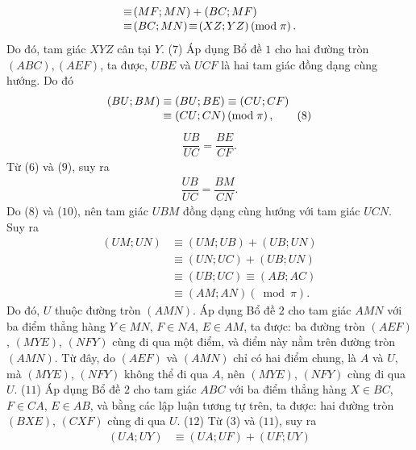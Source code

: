 \begin{multicols}{2}
\begin{align*}
			&\!\equiv\! \left( {MF;MN} \right) + \left( {BC;MF} \right) \\[-0.5ex]
			&\!\equiv\! \left( {BC;MN} \right) \!\equiv\! \left( {XZ;YZ} \right)\left( {{\rm{mod}}\;\pi } \right).
	\end{align*}
	Do đó, tam giác $XYZ$ cân tại $Y$. \hfill ($7$)
	\vskip 0.05cm
	Áp dụng Bổ đề $1$ cho hai đường tròn  $(ABC), (AEF)$, ta được, $UBE$ và $UCF$ là hai tam giác đồng dạng cùng hướng. Do đó
	\begin{align*}
		\left( {BU;BM} \right) &\equiv \left( {BU;BE} \right) \equiv \left( {CU;CF} \right) \\[-0.5ex]
		&\equiv \left( {CU;CN} \right)\left( {{\rm{mod}}\;\pi } \right), \tag{$8$}
	\end{align*}
	\begin{align*}
		\dfrac{{UB}}{{UC}} = \dfrac{{BE}}{{CF}}. \tag{$9$}
	\end{align*}
	Từ ($6$) và ($9$), suy ra
	\begin{align*}
		\dfrac{{UB}}{{UC}} = \dfrac{{BM}}{{CN}}. \tag{$10$}
	\end{align*}
	Do ($8$) và ($10$), nên tam giác $UBM$ đồng dạng cùng hướng với tam giác $UCN$. Suy ra
	\begin{align*}
			\left( {UM;UN} \right) &\equiv \left( {UM;UB} \right) + \left( {UB;UN} \right) \\[-0.5ex]
			&\equiv \left( {UN;UC} \right) + \left( {UB;UN} \right)\\[-0.5ex]
			&\equiv \left( {UB;UC} \right) \equiv \left( {AB;AC} \right) \\[-0.5ex]
			&\equiv \left( {AM;AN} \right)\left( {\bmod \pi } \right).
	\end{align*}
	Do đó, $U$ thuộc đường tròn $(AMN)$.
	\vskip 0.05cm
	Áp dụng Bổ đề $2$ cho tam giác $AMN$ với ba điểm thẳng hàng $Y \in MN$, $F \in NA$, $E \in AM$, ta được: ba đường tròn $(AEF)$, $(MYE)$, $(NFY)$ cùng đi qua một điểm, và điểm này nằm trên đường tròn $(AMN)$. Từ đây, do $(AEF)$ và $(AMN)$ chỉ có hai điểm chung, là $A$ và $U$, mà $(MYE)$, $(NFY)$ không thể đi qua $A$, nên $(MYE)$, $(NFY)$ cùng đi qua $U$. \hfill ($11$)
	\vskip 0.05cm
	Áp dụng Bổ đề $2$ cho tam giác $ABC$ với ba điểm thẳng hàng $X \in BC$, $F \in CA$, $E \in AB$, và bằng các lập luận tương tự trên, ta được: hai đường tròn $(BXE)$, $(CXF)$ cùng đi \linebreak qua $U$. \hfill  ($12$)
	\vskip 0.05cm
	Từ ($3$) và ($11$), suy ra
	\begin{align*}
			\left( {UA;UY} \right) &\equiv \left( {UA;UF} \right) + \left( {UF;UY} \right) \\[-0.5ex]

\end{align*}
\end{multicols}
